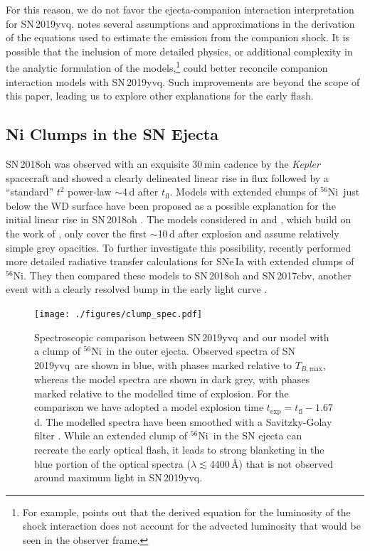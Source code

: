 \documentclass[twocolumn]{aastex63}
\newcommand{\tfl}{$t_\mathrm{fl}$}
\newcommand{\tbmax}{$T_{B,\mathrm{max}}$}
\newcommand{\radni}{$^{56}$Ni}
\newcommand{\sn}{SN\,2019yvq}
\begin{document}
For this reason, we do not favor the ejecta-companion interaction
interpretation for \sn. \citet{Kasen10a} notes several assumptions and
approximations in the derivation of the equations used to estimate the
emission from the companion shock. It is possible that the inclusion of more
detailed physics, or additional complexity in the analytic formulation of the
models,\footnote{For example, \citet{Kasen10a} points out that the derived
equation for the luminosity of the shock interaction does not account for the
advected luminosity that would be seen in the observer frame.} could better
reconcile companion interaction models with \sn. Such improvements are beyond
the scope of this paper, leading us to explore other explanations for the
early flash.

\subsection{Ni Clumps in the SN Ejecta}

SN\,2018oh was observed with an exquisite 30\,min cadence by the
\textit{Kepler} spacecraft and showed a clearly delineated linear rise in flux
followed by a ``standard'' $t^2$ power-law $\sim$4\,d after \tfl. Models with
extended clumps of \radni\ just below the WD surface have been proposed as a
possible explanation for the initial linear rise in SN\,2018oh
\citep{Shappee19,Dimitriadis19}. The models considered in \citet{Shappee19}
and \citet{Dimitriadis19}, which build on the work of \citet{Piro16}, only
cover the first $\sim$10\,d after explosion and assume relatively simple grey
opacities. To further investigate this possibility, \citet{Magee20a} recently
performed more detailed radiative transfer calculations for SNe\,Ia with
extended clumps of \radni. They then compared these models to SN\,2018oh and
SN\,2017cbv, another event with a clearly resolved bump in the early light
curve \citep{Hosseinzadeh17}.

\begin{figure}
    \centering
    \texttt{[image: ./figures/clump\_spec.pdf]}
    \caption{Spectroscopic comparison between \sn\ and our model with a clump
    of \radni\ in the outer ejecta. Observed spectra of \sn\ are shown in
    blue, with phases marked relative to \tbmax, whereas the model spectra are
    shown in dark grey, with phases marked relative to the modelled time of
    explosion. For the comparison we have adopted a model explosion time
    $t_\mathrm{exp} = t_\mathrm{fl} - 1.67$\,d. The modelled spectra have been
    smoothed with a Savitzky-Golay filter \citep{Savitzky64}. While an
    extended clump of \radni\ in the SN ejecta can recreate the early optical
    flash, it leads to strong blanketing in the blue portion of the optical
    spectra ($\lambda \lesssim 4400$\,\AA) that is not observed around maximum
    light in \sn. }
    \label{fig:Ni_bullet}
\end{figure}
\end{document}
